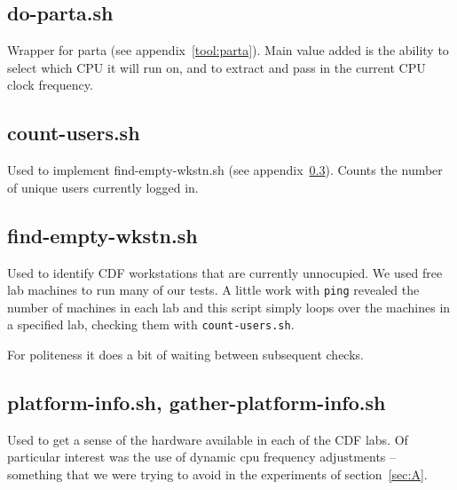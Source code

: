 \documentclass{article}
\begin{document}
\subsection{do-parta.sh} \label{tool:do-parta}
Wrapper for parta (see appendix~\ref{tool:parta}). Main value added is the
ability to select which CPU it will run on, and to extract and pass in the
current CPU clock frequency.
\begin{framed}
    \label{lst:do-parta}
    
\end{framed}

\subsection{count-users.sh} \label{tool:count-users.sh}
Used to implement find-empty-wkstn.sh (see appendix~\ref{tool:find-empty}).
Counts the number of unique users currently logged in.

\subsection{find-empty-wkstn.sh} \label{tool:find-empty}
Used to identify CDF workstations that are currently unnocupied. We used free
lab machines to run many of our tests. A little work with \lstinline{ping}
revealed the number of machines in each lab and this script simply loops over
the machines in a specified lab, checking them with \lstinline{count-users.sh}.

For politeness it does a bit of waiting between subsequent checks.
\begin{framed}
    \label{lst:find-empty}
    
\end{framed}

\subsection{platform-info.sh, gather-platform-info.sh} \label{tool:platform}
Used to get a sense of the hardware available in each of the CDF labs. Of
particular interest was the use of dynamic cpu frequency adjustments --
something that we were trying to avoid in the experiments of
section~\ref{sec:A}.
\end{document}

